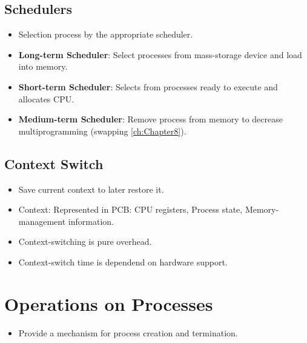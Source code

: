 \documentclass[10pt]{report}
\begin{document}
		\subsection{Schedulers}
			\begin{itemize}
				\item Selection process by the appropriate scheduler.
				\item \textbf{Long-term Scheduler}: Select processes from mass-storage device and load into memory.
				\item \textbf{Short-term Scheduler}: Selects from processes ready to execute and allocates CPU.
				\item \textbf{Medium-term Scheduler}: Remove process from memory to decrease multiprogramming (swapping \autoref{ch:Chapter8}).
			\end{itemize}

		\subsection{Context Switch}
			\begin{itemize}
				\item Save current context to later restore it.
				\item Context: Represented in PCB: CPU registers, Process state, Memory-management information.
				\item Context-switching is pure overhead.
				\item Context-switch time is dependend on hardware support.
			\end{itemize}

	\section{Operations on Processes}
		\begin{itemize}
			\item Provide a mechanism for process creation and termination.
		\end{itemize}
\end{document}
